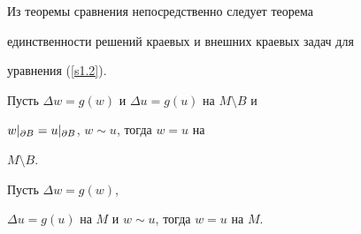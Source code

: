 Из теоремы сравнения непосредственно следует теорема


единственности решений краевых и внешних краевых задач для


уравнения (\ref{s1.2}).








\begin{props}


Пусть $\Delta w=g(w)$ и $\Delta u=g(u)$ на $M\setminus B$ и


$w|_{\partial{B}}=u|_{\partial{B}}$, $w\sim u$, тогда $w=u$ на


$M\setminus B$.





Пусть $\Delta w=g(w)$, 


$\Delta u=g(u)$ на $M$ и $w\sim u$, тогда $w=u$ на $M$.


\end{props} 











